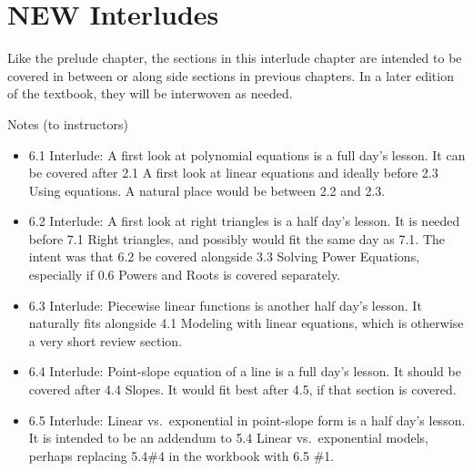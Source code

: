 \chapter{NEW Interludes}

Like the prelude chapter, the sections in this interlude chapter are intended to be covered in between or along side sections in previous chapters.  In a later edition of the textbook, they will be interwoven as needed.

Notes (to instructors)

\begin{itemize}
\item 6.1 Interlude: A first look at polynomial equations is a full day's lesson.  It can be covered after  2.1 A first look at linear equations and ideally before 2.3 Using equations.  A natural place would be between 2.2 and 2.3.

\item 6.2 Interlude: A first look at right triangles is a half day's lesson.  It is needed before 7.1 Right triangles, and possibly would fit the same day as 7.1.  The intent was that 6.2 be covered alongside 3.3 Solving Power Equations, especially if 0.6 Powers and Roots is covered separately.

\item 6.3 Interlude: Piecewise linear functions is another half day's lesson. It naturally fits alongside 4.1 Modeling with linear equations, which is otherwise a very short review section.

\item 6.4 Interlude: Point-slope equation of a line is a full day's lesson.  It should be covered after 4.4 Slopes. It would fit best after 4.5, if that section is covered.

\item 6.5 Interlude: Linear vs.\ exponential in point-slope form is a half day's lesson.  It is intended to be an addendum to 5.4 Linear vs.\ exponential models, perhaps replacing 5.4\#4 in the workbook with 6.5 \#1.

\end{itemize}

